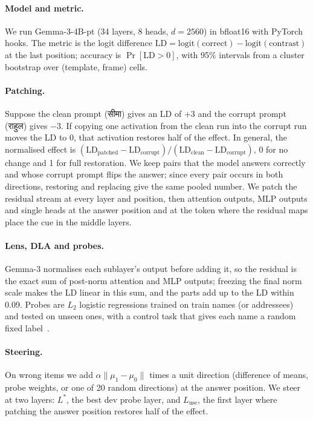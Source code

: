 \documentclass[11pt]{article}
\newcommand{\hi}[1]{{\devfont #1}}
\begin{document}
\paragraph{Model and metric.} We run Gemma-3-4B-pt (34 layers, 8 heads, $d=2560$) in bfloat16 with PyTorch hooks. The metric is the logit difference $\mathrm{LD}=\mathrm{logit}(\text{correct})-\mathrm{logit}(\text{contrast})$ at the last position; accuracy is $\Pr[\mathrm{LD}>0]$, with 95\% intervals from a cluster bootstrap over (template, frame) cells.

\paragraph{Patching.} Suppose the clean prompt (\hi{सीमा}) gives an LD of $+3$ and the corrupt prompt (\hi{राहुल}) gives $-3$. If copying one activation from the clean run into the corrupt run moves the LD to $0$, that activation restores half of the effect. In general, the normalised effect is $(\mathrm{LD}_\text{patched}-\mathrm{LD}_\text{corrupt})/(\mathrm{LD}_\text{clean}-\mathrm{LD}_\text{corrupt})$, 0 for no change and 1 for full restoration. We keep pairs that the model answers correctly and whose corrupt prompt flips the answer; since every pair occurs in both directions, restoring and replacing give the same pooled number. We patch the residual stream at every layer and position, then attention outputs, MLP outputs and single heads at the answer position and at the token where the residual maps place the cue in the middle layers.

\paragraph{Lens, DLA and probes.} Gemma-3 normalises each sublayer's output before adding it, so the residual is the exact sum of post-norm attention and MLP outputs; freezing the final norm scale makes the LD linear in this sum, and the parts add up to the LD within 0.09. Probes are $L_2$ logistic regressions trained on train names (or addressees) and tested on unseen ones, with a control task that gives each name a random fixed label~\cite{hewitt2019}.

\paragraph{Steering.} On wrong items we add $\alpha\lVert\mu_1-\mu_0\rVert$ times a unit direction (difference of means, probe weights, or one of 20 random directions) at the answer position. We steer at two layers: $L^\ast$, the best dev probe layer, and $L_\text{use}$, the first layer where patching the answer position restores half of the effect.
\end{document}
